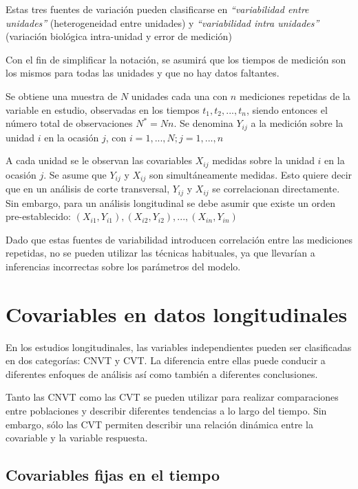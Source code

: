 \documentclass[spanish]{article}
\numberwithin{figure}{subsection}
\numberwithin{equation}{subsection}
\numberwithin{table}{subsection}
\begin{document}
Estas tres fuentes de variación pueden clasificarse en \textit{``variabilidad
entre unidades''} (heterogeneidad entre unidades) y \textit{``variabilidad
intra unidades''} (variación biológica intra-unidad y error de medición)

Con el fin de simplificar la notación, se asumirá que los tiempos de medición
son los mismos para todas las unidades y que no hay datos faltantes.

Se obtiene una muestra de $N$ unidades cada una con $n$ mediciones repetidas de
la variable en estudio, observadas en los tiempos $t_1, t_2, ..., t_n$, siendo
entonces el número total de observaciones $N^*=Nn$. Se denomina $Y_{ij}$ a la
medición sobre la unidad $i$ en la ocasión $j$, con $i=1, ..., N; j=1, ..., n$

A cada unidad se le observan las covariables $X_{ij}$ medidas sobre la unidad $i$
en la ocasión $j$. Se asume que $Y_{ij}$ y $X_{ij}$ son simultáneamente medidas.
Esto quiere decir que en un análisis de corte transversal, $Y_{ij}$ y $X_{ij}$
se correlacionan directamente. Sin embargo, para un análisis longitudinal se
debe asumir que existe un orden pre-establecido: $(X_{i1}, Y_{i1}), (X_{i2},
Y_{i2}), ..., (X_{in}, Y_{in})$

Dado que estas fuentes de variabilidad introducen correlación entre las
mediciones repetidas, no se pueden utilizar las técnicas habituales, ya que
llevarían a inferencias incorrectas sobre los parámetros del modelo.

\section{Covariables en datos longitudinales}

En los estudios longitudinales, las variables independientes pueden ser
clasificadas en dos categorías: CNVT y CVT. La diferencia entre
ellas puede conducir a diferentes enfoques de análisis así como también a
diferentes conclusiones.

Tanto las CNVT como las CVT se pueden utilizar para realizar comparaciones entre
poblaciones y describir diferentes tendencias a lo largo del tiempo. Sin
embargo, sólo las CVT permiten describir una relación dinámica entre la
covariable y la variable respuesta.

\subsection{Covariables fijas en el tiempo}
\end{document}
